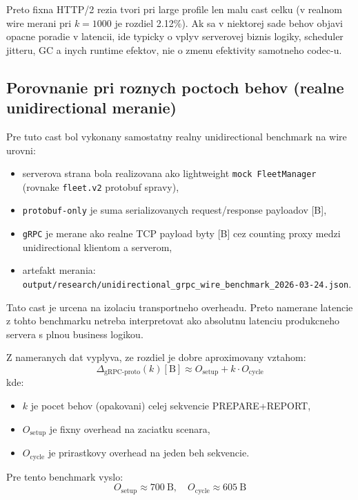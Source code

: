 \documentclass[12pt,a4paper]{report}
\begin{document}
Preto fixna HTTP/2 rezia tvori pri large profile len malu cast celku
(v realnom wire merani pri $k=1000$ je rozdiel 2.12\%).
Ak sa v niektorej sade behov objavi opacne poradie v latencii,
ide typicky o vplyv serverovej biznis logiky, scheduler jitteru,
GC a inych runtime efektov, nie o zmenu efektivity samotneho codec-u.

\subsection{Porovnanie pri roznych poctoch behov (realne unidirectional meranie)}

Pre tuto cast bol vykonany samostatny realny unidirectional benchmark na wire urovni:
\begin{itemize}
  \item serverova strana bola realizovana ako lightweight
  \texttt{mock FleetManager} (rovnake \texttt{fleet.v2} protobuf spravy),
  \item \texttt{protobuf-only} je suma serializovanych request/response payloadov [B],
  \item \texttt{gRPC} je merane ako realne TCP payload byty [B] cez counting proxy
  medzi unidirectional klientom a serverom,
  \item artefakt merania:
  \texttt{output/research/unidirectional\_grpc\_wire\_benchmark\_2026-03-24.json}.
\end{itemize}

Tato cast je urcena na izolaciu transportneho overheadu.
Preto namerane latencie z tohto benchmarku netreba interpretovat
ako absolutnu latenciu produkcneho servera s plnou business logikou.

Z nameranych dat vyplyva, ze rozdiel je dobre aproximovany vztahom:
\begin{equation}
\Delta_{\text{gRPC-proto}}(k) [\text{B}] \approx O_{\text{setup}} + k \cdot O_{\text{cycle}}
\end{equation}
kde:
\begin{itemize}
  \item $k$ je pocet behov (opakovani) celej sekvencie PREPARE+REPORT,
  \item $O_{\text{setup}}$ je fixny overhead na zaciatku scenara,
  \item $O_{\text{cycle}}$ je prirastkovy overhead na jeden beh sekvencie.
\end{itemize}

Pre tento benchmark vyslo:
\begin{equation}
O_{\text{setup}} \approx 700~\text{B}, \quad O_{\text{cycle}} \approx 605~\text{B}
\end{equation}
\end{document}
